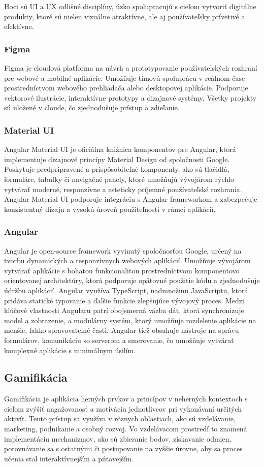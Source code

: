 Hoci sú UI a UX odlišné disciplíny, úzko spolupracujú s cieľom vytvoriť digitálne produkty, ktoré sú nielen vizuálne atraktívne, ale aj používateľsky prívetivé a efektívne.\cite{uiux}
\subsubsection{Figma}
Figma je cloudová platforma na návrh a prototypovanie používateľských rozhraní pre webové a mobilné aplikácie. 
Umožňuje tímovú spoluprácu v reálnom čase prostredníctvom webového prehliadača alebo desktopovej aplikácie. Podporuje vektorové ilustrácie, interaktívne prototypy a dizajnové systémy.
 Všetky projekty sú uložené v cloude, čo zjednodušuje prístup a zdieľanie. \cite{figma}
 \subsubsection{Material UI}
 Angular Material UI je oficiálna knižnica komponentov pre Angular, ktorá implementuje dizajnové princípy Material Design od spoločnosti Google. 
 Poskytuje predpripravené a prispôsobiteľné komponenty, ako sú tlačidlá, formuláre, tabuľky či navigačné panely, ktoré umožňujú vývojárom rýchlo vytvárať moderné, responzívne a esteticky príjemné používateľské rozhrania.
  Angular Material UI podporuje integráciu s Angular frameworkom a zabezpečuje konzistentný dizajn a vysokú úroveň použiteľnosti v rámci aplikácií. \cite{materialUI}
 \subsubsection{Angular}
 Angular je open-source framework vyvinutý spoločnosťou Google, určený na tvorbu dynamických a responzívnych webových aplikácií.
  Umožňuje vývojárom vytvárať aplikácie s bohatou funkcionalitou prostredníctvom komponentovo orientovanej architektúry, ktorá podporuje opätovné použitie kódu a zjednodušuje údržbu aplikácií.
   Angular využíva TypeScript, nadmnožinu JavaScriptu, ktorá pridáva statické typovanie a ďalšie funkcie zlepšujúce vývojový proces. 
   Medzi kľúčové vlastnosti Angularu patrí obojsmerná väzba dát, ktorá synchronizuje model a zobrazenie, a modulárny systém, ktorý umožňuje rozdelenie aplikácie na menšie, ľahko spravovateľné časti.
  Angular tiež obsahuje nástroje na správu formulárov, komunikáciu so serverom a smerovanie, čo umožňuje vytvárať komplexné aplikácie s minimálnym úsilím. \cite{angular}



\subsection{Gamifikácia}
Gamifikácia je aplikácia herných prvkov a princípov v neherných kontextoch s cieľom zvýšiť angažovanosť a motiváciu jednotlivcov pri vykonávaní určitých aktivít.
 Tento prístup sa využíva v rôznych oblastiach, ako sú vzdelávanie, marketing, podnikanie a osobný rozvoj.
Vo vzdelávacom prostredí to znamená implementáciu mechanizmov, ako sú zbieranie bodov, získavanie odmien, porovnávanie sa s ostatnými či postupovanie na vyššie úrovne, aby sa proces učenia stal interaktívnejším a pútavejším. 
